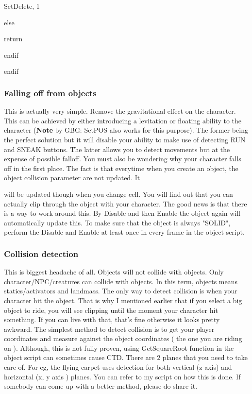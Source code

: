 \documentclass[
]{article}
\begin{document}
SetDelete, 1

else

return

endif

endif

\hypertarget{falling-off-from-objects}{%
\subsubsection{\texorpdfstring{Falling off from objects
}{Falling off from objects }}\label{falling-off-from-objects}}

This is actually very simple. Remove the gravitational effect on the
character. This can be achieved by either introducing a levitation or
floating ability to the character (\textbf{Note} by GBG: SetPOS also
works for this purpose). The former being the perfect solution but it
will disable your ability to make use of detecting RUN and SNEAK
buttons. The latter allows you to detect movements but at the expense of
possible falloff. You must also be wondering why your character falls
off in the first place. The fact is that everytime when you create an
object, the object collision parameter are not updated. It

will be updated though when you change cell. You will find out that you
can actually clip through the object with your character. The good news
is that there is a way to work around this. By Disable and then Enable
the object again will automatically update this. To make sure that the
object is always "SOLID", perform the Disable and Enable at least once
in every frame in the object script.

\hypertarget{collision-detection}{%
\subsubsection{\texorpdfstring{Collision detection
}{Collision detection }}\label{collision-detection}}

This is biggest headache of all. Objects will not collide with objects.
Only character/NPC/creatures can collide with objects. In this term,
objects means statics/activators and landmass. The only way to detect
collision is when your character hit the object. That is why I mentioned
earlier that if you select a big object to ride, you will see clipping
until the moment your character hit something. If you can live with
that, that's fine otherwise it looks pretty awkward. The simplest method
to detect collision is to get your player coordinates and measure
against the object coordinates ( the one you are riding on ). Although,
this is not fully proven, using GetSquareRoot function in the object
script can sometimes cause CTD. There are 2 planes that you need to take
care of. For eg, the flying carpet uses detection for both vertical (z
axis) and horizontal (x, y axis ) planes. You can refer to my script on
how this is done. If somebody can come up with a better method, please
do share it.
\end{document}
